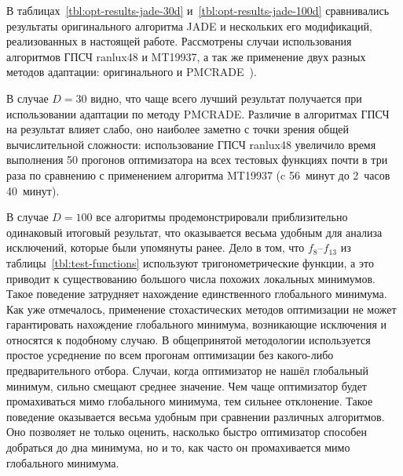 В таблицах~\ref{tbl:opt-results-jade-30d}
и~\ref{tbl:opt-results-jade-100d} сравнивались результаты
оригинального алгоритма JADE и нескольких его модификаций,
реализованных в настоящей работе. Рассмотрены случаи использования
алгоритмов ГПСЧ ranlux48 и MT19937, а так же применение двух разных
методов адаптации: оригинального и PMCRADE~\cite{Li-PMCRADE-2011}).

В случае $D=30$ видно, что чаще всего лучший результат получается при
использовании адаптации по методу PMCRADE. Различие в алгоритмах ГПСЧ
на результат влияет слабо, оно наиболее заметно с точки зрения общей
вычислительной сложности: использование ГПСЧ ranlux48 увеличило
время выполнения 50 прогонов оптимизатора на всех тестовых функциях
почти в три раза по сравнению с применением алгоритма MT19937 (c
56~минут до 2~часов 40~минут).

В случае $D=100$ все алгоритмы продемонстрировали приблизительно
одинаковый итоговый результат, что оказывается весьма удобным для
 анализа исключений, которые были упомянуты
ранее. Дело в том, что $f_8$--$f_{13}$ из
таблицы~\ref{tbl:test-functions} используют тригонометрические
функции, а это приводит к существованию большого числа похожих локальных
минимумов. Такое поведение затрудняет нахождение единственного
глобального минимума.  Как уже отмечалось, применение стохастических
методов оптимизации не может гарантировать нахождение глобального
минимума, возникающие исключения и относятся к подобному случаю. В
общепринятой методологии используется простое усреднение по всем
прогонам оптимизации без какого-либо предварительного отбора.  Случаи,
когда оптимизатор не нашёл глобальный минимум, сильно смещают среднее
значение.  Чем чаще оптимизатор будет промахиваться мимо глобального
минимума, тем сильнее отклонение.  Такое поведение оказывается весьма
удобным при сравнении различных алгоритмов.  Оно позволяет не только
оценить, насколько быстро оптимизатор способен добраться до дна
минимума, но и то, как часто он промахивается мимо глобального
минимума.


